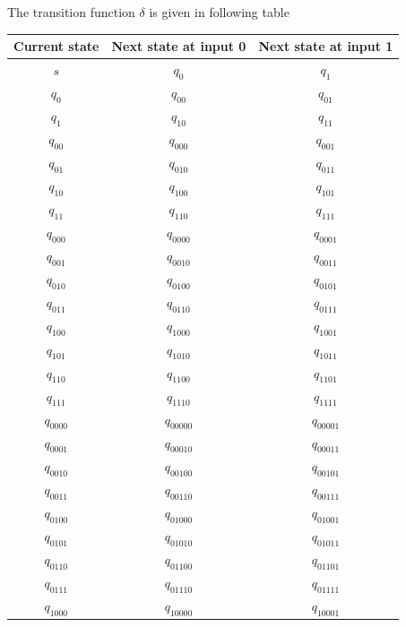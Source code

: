 \documentclass{article}
\begin{document}
    \quad The transition function $\delta$ is given in following table\\
    \begin{longtable}{|c|c|c|}
      \hline
       \textbf{Current state} & \textbf{Next state at input 0} & \textbf{Next state at input 1} \\ \hline
      $s$ & $q_{0}$ & $q_{1}$ \\ \hline
      $q_{0}$ & $q_{00}$ & $q_{01}$ \\ \hline
      $q_{1}$ & $q_{10}$ & $q_{11}$ \\ \hline
      $q_{00}$ & $q_{000}$ & $q_{001}$ \\ \hline
      $q_{01}$ & $q_{010}$ & $q_{011}$ \\ \hline
      $q_{10}$ & $q_{100}$ & $q_{101}$ \\ \hline
      $q_{11}$ & $q_{110}$ & $q_{111}$ \\ \hline
      $q_{000}$ & $q_{0000}$ & $q_{0001}$ \\ \hline
      $q_{001}$ & $q_{0010}$ & $q_{0011}$ \\ \hline
      $q_{010}$ & $q_{0100}$ & $q_{0101}$ \\ \hline
      $q_{011}$ & $q_{0110}$ & $q_{0111}$ \\ \hline
      $q_{100}$ & $q_{1000}$ & $q_{1001}$ \\ \hline
      $q_{101}$ & $q_{1010}$ & $q_{1011}$ \\ \hline
      $q_{110}$ & $q_{1100}$ & $q_{1101}$ \\ \hline
      $q_{111}$ & $q_{1110}$ & $q_{1111}$ \\ \hline
      $q_{0000}$ & $q_{00000}$ & $q_{00001}$ \\ \hline
      $q_{0001}$ & $q_{00010}$ & $q_{00011}$ \\ \hline
      $q_{0010}$ & $q_{00100}$ & $q_{00101}$ \\ \hline
      $q_{0011}$ & $q_{00110}$ & $q_{00111}$ \\ \hline
      $q_{0100}$ & $q_{01000}$ & $q_{01001}$ \\ \hline
      $q_{0101}$ & $q_{01010}$ & $q_{01011}$ \\ \hline
      $q_{0110}$ & $q_{01100}$ & $q_{01101}$ \\ \hline
      $q_{0111}$ & $q_{01110}$ & $q_{01111}$ \\ \hline
      $q_{1000}$ & $q_{10000}$ & $q_{10001}$ \\ \hline

\end{longtable}
\end{document}
